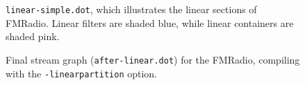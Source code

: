 \begin{figure}[t]
\centering
{}
\caption{{\tt linear-simple.dot}, which illustrates the linear sections of FMRadio.  Linear filters are shaded blue, while linear containers are shaded pink.\protect\label{fig:fm-linear-simple}}
\end{figure}

\begin{figure}[t]
\vspace{-6pt}
\begin{center}
\mbox{}
\vspace{-6pt}
\caption{Final stream graph ({\tt after-linear.dot}) for the FMRadio, compiling with the {\tt -linearpartition} option.\protect\label{fig:fm-after-linear}}
\end{center}
\vspace{-14pt}
\end{figure}

